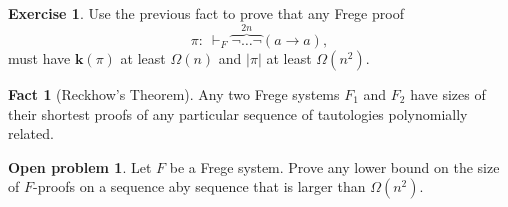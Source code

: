 \documentclass{article}
\theoremstyle{definition}
\newtheorem{excs}[thrm]{Exercise}
\newtheorem{fact}[thrm]{Fact}
\newtheorem{prbl}[thrm]{Open problem}
\newcommand{\abs}[1]{\lvert #1 \rvert}
\renewcommand{\k}{\textbf{k}}
\begin{document}
\begin{excs}
    Use the previous fact to prove that any Frege proof \[\pi:\: \vdash_F \overbrace{\lnot \dots \lnot}^{2n}(a\to a),\] must have $\k(\pi)$ at least $\Omega(n)$ and $\abs{\pi}$ at least $\Omega(n^2)$.
\end{excs}

\begin{fact}[Reckhow's Theorem]
   Any two Frege systems $F_1$ and $F_2$ have sizes of their shortest proofs of any particular sequence of tautologies polynomially related. 
\end{fact}

\begin{prbl}
    Let $F$ be a Frege system. Prove any lower bound on the size of $F$-proofs on a sequence aby sequence that is larger than $\Omega(n^2)$.
\end{prbl}
\end{document}
